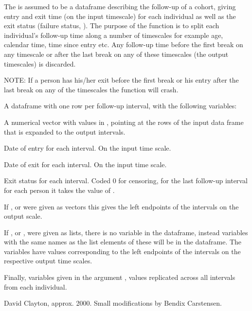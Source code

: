\begin{Details}\relax
The  is assumed to be a dataframe describing the follow-up
of a cohort, giving entry and exit time (on the input timescale) for each
individual as well as the exit status (failure status,
). The purpose of the function is to split each
individual's follow-up time along a number of timescales for example
age, calendar time, time since entry etc.
Any follow-up time before the first break
on any timescale or after the last break on any of these timescales
(the output timescales) is discarded.

NOTE: If a person has his/her exit before the first break or his entry
after the last break on any of the timescales the function will crash.
\end{Details}
\begin{Value}
A dataframe with one row per follow-up interval, with the following
variables: \begin{ldescription}
\item[\code{Expand}] A numerical vector with values in
, pointing at the rows of the input data frame
that is expanded to the output intervals.
\item[\code{Entry}] Date of entry for each interval. On the input time scale.
\item[\code{Exit}] Date of exit for each interval. On the input time scale.
\item[\code{Fail}] Exit status for each interval. Coded 0 for censoring, for
the last follow-up interval for each person it takes the value of
.
\item[\code{Time}] If ,  or  were given
as vectors this gives the left endpoints of the intervals
on the output scale.

If ,  or
, were given as lists, there is no variable 
in the dataframe, instead variables with the same names as
the list elements of these will be in the dataframe. The variables
have values corresponding to the left endpoints of the intervals on
the respective output time scales.
\item[\code{}] 
\end{ldescription}
 Finally, variables given in the argument , values
replicated across all intervals from each individual.
\end{Value}
\begin{Author}\relax
David Clayton, approx. 2000.
Small modifications by Bendix Carstensen.
\end{Author}
